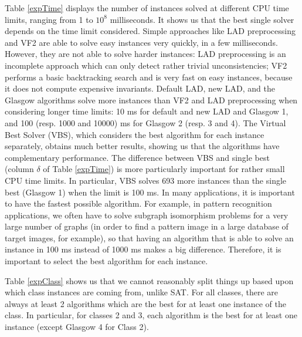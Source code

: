 \documentclass{llncs}
\begin{document}
Table \ref{expTime} displays the number of instances solved at different CPU time limits, ranging
from 1 to $10^8$ milliseconds. It shows us that the best single solver depends on the time limit
considered. Simple approaches like LAD preprocessing and VF2 are able to solve easy instances very
quickly, in a few milliseconds. However, they are not able to solve harder instances: LAD
preprocessing is an incomplete approach which can only detect rather trivial unconsistencies; VF2
performs a basic backtracking search and is very fast on easy instances, because it does not compute
expensive invariants. Default LAD, new LAD, and the Glasgow algorithms solve more instances than VF2
and LAD preprocessing when considering longer time limits: 10 ms for default and new LAD and Glasgow
1, and 100 (resp. 1000 and 10000) ms for Glasgow 2 (resp. 3 and 4). The Virtual Best Solver (VBS),
which considers the best algorithm for each instance separately, obtains much better results,
showing us that the algorithms have complementary performance. The difference between VBS and single
best (column $\delta$ of Table \ref{expTime}) is more particularly important for rather small CPU
time limits. In particular, VBS solves 693 more instances than the single best (Glasgow 1) when the
limit is 100 ms. In many applications, it is important to have the fastest possible algorithm. For
example, in pattern recognition applications, we often have to solve subgraph isomorphism problems
for a very large number of graphs (in order to find a pattern image in a large database of target
images, for example), so that having an algorithm that is able to solve an instance in 100 ms
instead of 1000 ms makes a big difference. Therefore, it is important to select the best algorithm
for each instance.

Table \ref{expClass} shows us that we cannot reasonably split things up based upon which class
instances are coming from, unlike SAT. For all classes, there are always at least 2 algorithms which
are the best for at least one instance of the class. In particular, for classes 2 and 3, each
algorithm is the best for at least one instance (except Glasgow 4 for Class 2).
\end{document}

